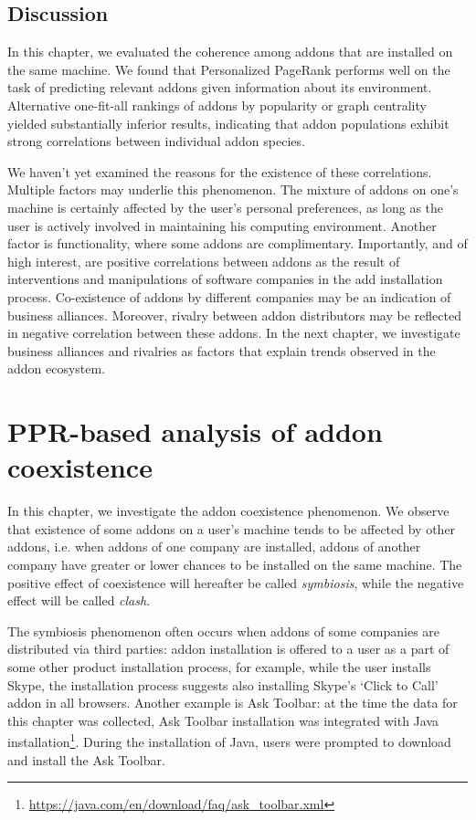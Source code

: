 \documentclass[ijoc,nonblindrev]{informs3} %
\numberwithin{equation}{subsection}
\begin{document}
\subsection{Discussion}

In this chapter, we evaluated the coherence among addons that are installed on the same machine. We found that Personalized PageRank performs well on the task of predicting relevant addons given information about its environment. Alternative one-fit-all rankings of addons by popularity or graph centrality yielded substantially inferior results, indicating that addon populations exhibit strong correlations between individual addon species.  

We haven't yet examined the reasons for the existence of these correlations. Multiple factors may underlie this phenomenon. The mixture of addons on one's machine is certainly affected by the user's personal preferences, as long as the user is actively involved in maintaining his computing environment. Another factor is functionality, where some addons are complimentary. Importantly, and of high interest, are positive correlations between addons as the result of interventions and manipulations of software companies in the add installation process. Co-existence of addons by different companies may be an indication of  business alliances. Moreover, rivalry between addon distributors may be reflected in negative correlation between these addons. In the next chapter, we investigate business alliances and rivalries as factors that explain trends observed in the addon ecosystem.  

\section{PPR-based analysis of addon coexistence}
\label{chap:Symbiosis}

In this chapter, we investigate the addon coexistence phenomenon. We observe that existence of some addons on a user's machine tends to be affected by other addons, i.e. when addons of one company are installed, addons of another company have greater or lower chances to be installed on the same machine. The positive effect of coexistence will hereafter be called \emph{symbiosis}, while the negative effect will be called \emph{clash}.

The symbiosis phenomenon often occurs when addons of some companies are distributed via third parties: addon installation is offered to a user as a part of some other product installation process, for example, while the user installs Skype, the installation process suggests also installing Skype's `Click to Call' addon in all browsers. Another example is Ask Toolbar: at the time the data for this chapter was collected, Ask Toolbar installation was integrated with Java installation\footnote{\url{https://java.com/en/download/faq/ask_toolbar.xml}}. During the installation of Java, users were prompted to download and install the Ask Toolbar.

\end{document}
